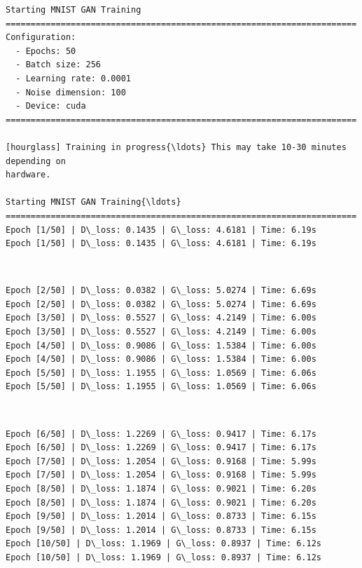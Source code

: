 \documentclass[11pt]{article}
\begin{document}
    \begin{Verbatim}[commandchars=\\\{\}]
Starting MNIST GAN Training
======================================================================
Configuration:
  - Epochs: 50
  - Batch size: 256
  - Learning rate: 0.0001
  - Noise dimension: 100
  - Device: cuda
======================================================================

[hourglass] Training in progress{\ldots} This may take 10-30 minutes depending on
hardware.

Starting MNIST GAN Training{\ldots}
======================================================================
Epoch [1/50] | D\_loss: 0.1435 | G\_loss: 4.6181 | Time: 6.19s
Epoch [1/50] | D\_loss: 0.1435 | G\_loss: 4.6181 | Time: 6.19s
    \end{Verbatim}

    \begin{center}
    \end{center}
    { \hspace*{\fill} \\}
    
    \begin{Verbatim}[commandchars=\\\{\}]
Epoch [2/50] | D\_loss: 0.0382 | G\_loss: 5.0274 | Time: 6.69s
Epoch [2/50] | D\_loss: 0.0382 | G\_loss: 5.0274 | Time: 6.69s
Epoch [3/50] | D\_loss: 0.5527 | G\_loss: 4.2149 | Time: 6.00s
Epoch [3/50] | D\_loss: 0.5527 | G\_loss: 4.2149 | Time: 6.00s
Epoch [4/50] | D\_loss: 0.9086 | G\_loss: 1.5384 | Time: 6.00s
Epoch [4/50] | D\_loss: 0.9086 | G\_loss: 1.5384 | Time: 6.00s
Epoch [5/50] | D\_loss: 1.1955 | G\_loss: 1.0569 | Time: 6.06s
Epoch [5/50] | D\_loss: 1.1955 | G\_loss: 1.0569 | Time: 6.06s
    \end{Verbatim}

    \begin{center}
    \end{center}
    { \hspace*{\fill} \\}
    
    \begin{Verbatim}[commandchars=\\\{\}]
Epoch [6/50] | D\_loss: 1.2269 | G\_loss: 0.9417 | Time: 6.17s
Epoch [6/50] | D\_loss: 1.2269 | G\_loss: 0.9417 | Time: 6.17s
Epoch [7/50] | D\_loss: 1.2054 | G\_loss: 0.9168 | Time: 5.99s
Epoch [7/50] | D\_loss: 1.2054 | G\_loss: 0.9168 | Time: 5.99s
Epoch [8/50] | D\_loss: 1.1874 | G\_loss: 0.9021 | Time: 6.20s
Epoch [8/50] | D\_loss: 1.1874 | G\_loss: 0.9021 | Time: 6.20s
Epoch [9/50] | D\_loss: 1.2014 | G\_loss: 0.8733 | Time: 6.15s
Epoch [9/50] | D\_loss: 1.2014 | G\_loss: 0.8733 | Time: 6.15s
Epoch [10/50] | D\_loss: 1.1969 | G\_loss: 0.8937 | Time: 6.12s
Epoch [10/50] | D\_loss: 1.1969 | G\_loss: 0.8937 | Time: 6.12s
    \end{Verbatim}
\end{document}
